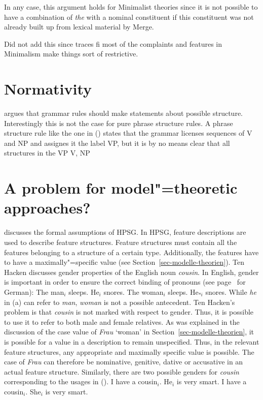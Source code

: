 \largerpage
In any case, this argument holds for Minimalist theories since it is not possible to have a combination
of \emph{the} with a nominal constituent if this constituent was not already built up from lexical
material by Merge.

Did not add this since traces fi most of the complaints and features in Minimalism make things sort
of restrictive.
\section{Normativity}

\citet{Pullum2019a} argues that grammar rules should make statements about possible
structure. Interestingly this is not the case for pure phrase structure rules. A phrase structure
rule like the one in () states that the grammar licenses sequences of V and NP and assignes
it the label VP, but it is by no means clear that all structures in the  
\ea
VP \to V, NP
\z
\fi

\section{A problem for model"=theoretic approaches?}
\label{Abschnitt-MTS-ten-Hacken}

\mbox{} discusses the formal assumptions of HPSG\indexhpsg. In HPSG, feature descriptions are used to describe feature
structures. Feature structures must contain all the features belonging to a structure of a certain
type. Additionally, the features have to have a maximally"=specific value (see
Section~\ref{sec-modelle-theorien}). Ten Hacken discusses gender properties of the
English noun \emph{cousin}. In English, gender is important in order to ensure the correct binding
of pronouns (see page~\pageref{le-buch} for German): 
\eal
\ex The man$_i$ sleeps. He$_i$ snores.
\ex The woman$_i$ sleeps. He$_{*i}$ snores.
\zl
While \emph{he} in (a) can refer to \emph{man}, \emph{woman} is not a possible antecedent. Ten Hacken's problem is that \emph{cousin}
is not marked with respect to gender. Thus, it is possible to use it to refer to both male and female relatives.
As was explained in the discussion of the case value of \emph{Frau} `woman' in Section~\ref{sec-modelle-theorien}, it is possible for a
value in a description to remain unspecified. Thus, in the relevant feature structures, any
appropriate and maximally specific value is possible. The case of \emph{Frau} can therefore be nominative, genitive, dative or accusative in an actual feature structure.
Similarly, there are two possible genders for \emph{cousin} corresponding to the usages in ().
\eal
\ex I have a cousin$_i$. He$_i$ is very smart.
\ex I have a cousin$_i$. She$_i$ is very smart.
\zl

